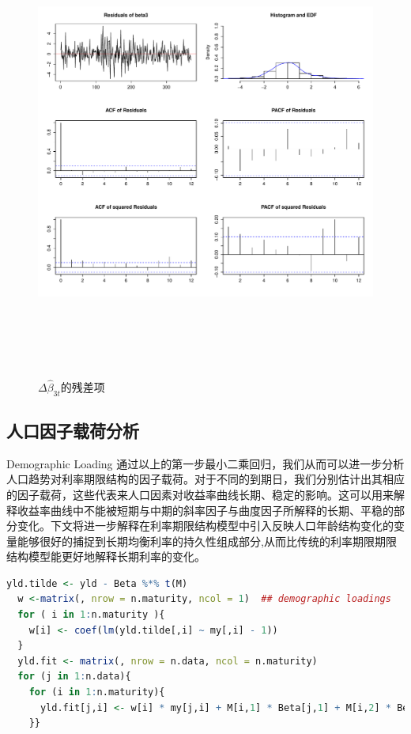           \begin{figure}%
       \includegraphics[width=15cm,height=15cm]{figures/Rplot16}
      \caption{$\Delta\hat{\beta}_{3t}$的残差项}
      \label{Rplot16}
     \end{figure}

\subsection{人口因子载荷分析}{Demographic Loading}
通过以上的第一步最小二乘回归，我们从而可以进一步分析人口趋势对利率期限结构的因子载荷。对于不同的到期日，我们分别估计出其相应的因子载荷，这些代表来人口因素对收益率曲线长期、稳定的影响。这可以用来解释收益率曲线中不能被短期与中期的斜率因子与曲度因子所解释的长期、平稳的部分变化。下文将进一步解释在利率期限结构模型中引入反映人口年龄结构变化的变量能够很好的捕捉到长期均衡利率的持久性组成部分,从而比传统的利率期限期限结构模型能更好地解释长期利率的变化。

 \begin{lstlisting}[language=R]
  yld.tilde <- yld - Beta %*% t(M)
  w <-matrix(, nrow = n.maturity, ncol = 1)  ## demographic loadings
  for ( i in 1:n.maturity ){
    w[i] <- coef(lm(yld.tilde[,i] ~ my[,i] - 1))
  }
  yld.fit <- matrix(, nrow = n.data, ncol = n.maturity)
  for (j in 1:n.data){
    for (i in 1:n.maturity){
      yld.fit[j,i] <- w[i] * my[j,i] + M[i,1] * Beta[j,1] + M[i,2] * Beta[j,2]
    }}
 \end{lstlisting}

